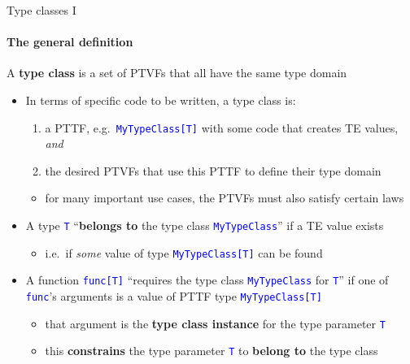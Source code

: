 \documentclass[english]{beamer}
\begin{document}
\begin{frame}{Type classes I}


\framesubtitle{The general definition}

A \textbf{type class} is a set of PTVFs that all have the same type
domain
\begin{itemize}
\item In terms of specific code to be written, a type class is:
\begin{enumerate}
\item a PTTF, e.g.\ \texttt{\textcolor{blue}{\footnotesize{}MyTypeClass{[}T{]}}}
with some code that creates TE values, \emph{and}
\item the desired PTVFs that use this PTTF to define their type domain
\end{enumerate}
\begin{itemize}
\item for many important use cases, the PTVFs must also satisfy certain
laws
\end{itemize}
\item A type \texttt{\textcolor{blue}{\footnotesize{}T}} ``\textbf{belongs
to} the type class \texttt{\textcolor{blue}{\footnotesize{}MyTypeClass}}''
if a TE value exists
\begin{itemize}
\item i.e.\ if \emph{some} value of type \texttt{\textcolor{blue}{\footnotesize{}MyTypeClass{[}T{]}}}
can be found
\end{itemize}
\item A function \texttt{\textcolor{blue}{\footnotesize{}func{[}T{]}}} ``requires
the type class \texttt{\textcolor{blue}{\footnotesize{}MyTypeClass}}
for \texttt{\textcolor{blue}{\footnotesize{}T}}'' if one of \texttt{\textcolor{blue}{\footnotesize{}func}}'s
arguments is a value of PTTF type \texttt{\textcolor{blue}{\footnotesize{}MyTypeClass{[}T{]}}}{\footnotesize \par}
\begin{itemize}
\item that argument is the \textbf{type class instance} for the type parameter
\texttt{\textcolor{blue}{\footnotesize{}T}}{\footnotesize \par}
\item this \textbf{constrains} the type parameter \texttt{\textcolor{blue}{\footnotesize{}T}}
to \textbf{belong to} the type class
\end{itemize}
\end{itemize}
\end{frame}
\end{document}
